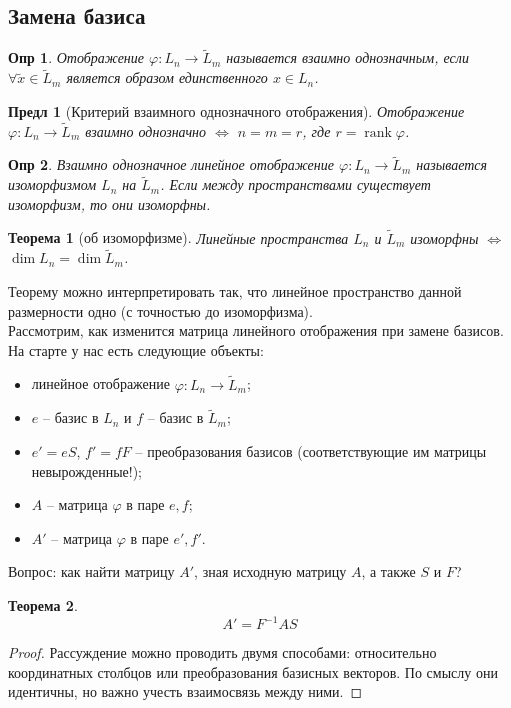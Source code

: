 \documentclass[a4paper,12pt]{article}
\DeclareMathOperator{\rank}{\mathop{rank}}
\newtheorem*{definition}{Опр}
\newtheorem{theorem}{Теорема}[section]
\newtheorem{propos}{Предл}[section]
\begin{document}
\subsection{Замена базиса}

\begin{definition}
	Отображение $\varphi: L_n \to \tilde{L}_m$ называется взаимно однозначным, если $\forall \tilde{x} \in \tilde{L}_m$ является образом единственного $x \in L_n$.
\end{definition}

\begin{propos}[Критерий взаимного однозначного отображения]
	Отображение $\varphi: L_n \to \tilde{L}_m$ взаимно однозначно $\Leftrightarrow$ $n = m = r$, где $r = \rank \varphi$.
\end{propos}

\begin{definition}
	Взаимно однозначное линейное отображение $\varphi: L_n \to \tilde{L}_m$ называется изоморфизмом $L_n$ на $\tilde{L}_m$. Если между пространствами существует изоморфизм, то они изоморфны.
\end{definition}

\begin{theorem}[об изоморфизме]
	Линейные пространства $L_n$ и $\tilde{L}_m$ изоморфны $\Leftrightarrow$ $\dim L_n = \dim \tilde{L}_m$.
\end{theorem}

Теорему можно интерпретировать так, что линейное пространство данной размерности одно (с точностью до изоморфизма). \\


Рассмотрим, как изменится матрица линейного отображения при замене базисов. На старте у нас есть следующие объекты: 
\begin{itemize}
	\item линейное отображение $\varphi: L_n \to \tilde{L}_m$;
	\item $e$ -- базис в $L_n$ и $f$ -- базис в $\tilde{L}_m$;
	\item $e' = eS$, $f' = fF$ -- преобразования базисов (соответствующие им матрицы невырожденные!);
	\item $A$ -- матрица $\varphi$ в паре $e,f$;
	\item $A'$ -- матрица $\varphi$ в паре $e', f'$.
\end{itemize}
Вопрос: как найти матрицу $A'$, зная исходную матрицу $A$, а также $S$ и $F$? 

\begin{theorem}
	\[	
		A' = F^{-1}AS
	\]
\end{theorem}
\begin{proof}
	Рассуждение можно проводить двумя способами: относительно координатных столбцов или преобразования базисных векторов. По смыслу они идентичны, но важно учесть взаимосвязь между ними.
\end{proof}
\end{document}
